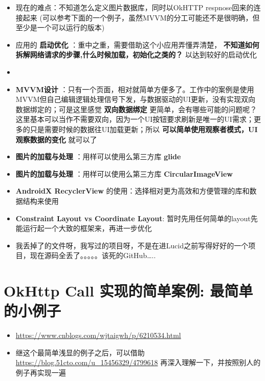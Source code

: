 \documentclass[9pt, b5paper]{article}
\begin{document}
\begin{itemize}
\item 现在的难点：不知道怎么定义图片数据库，同时以OkHTTP respnose回来的连接起来 (可以参考下面的一个例子，虽然MVVM的分工可能还不是很明确，但至少是一个可以运行的版本)
\item 应用的 \textbf{启动优化} ：重中之重，需要借助这个小应用弄懂弄清楚， \textbf{不知道如何拆解网络请求的步骤,什么时候加载，初始化之类的？} 以达到较好的启动优化
\item 
\item \textbf{MVVM设计} ：只有一个页面，相对就简单方便多了。工作中的案例是使用MVVM但自己编辑逻辑处理信号下发，与数据驱动的UI更新，没有实现双向数据绑定的；可是这里感觉 \textbf{双向数据绑定} 更简单，会有哪些可能的问题呢？这里基本可以当作不需要双向，因为一个UI按钮要求刷新是唯一的UI需求；更多的只是需要时候的数据往UI加载更新；所以 \textbf{可以简单使用观察者模式，UI观察数据的变化} 就可以了
\item \textbf{图片的加载与处理} ：用样可以使用么第三方库 \textbf{glide}
\item \textbf{图片的加载与处理} ：用样可以使用么第三方库 \textbf{CircularImageView}
\item \textbf{AndroidX RecyclerView} 的使用：选择相对更为高效和方便管理的库和数据结构来使用
\item \textbf{Constraint Layout vs Coordinate Layout}: 暂时先用任何简单的layout先能运行起一个大致的框架来，再进一步优化
\item 我丢掉了的文件呀，我写过的项目呀，不是在进Lucid之前写得好好的一个项目，现在源码全丢了。。。。。该死的GitHub\ldots{}..
\end{itemize}

\section{OkHttp Call 实现的简单案例: 最简单的小例子}
\label{sec-3}
\begin{itemize}
\item \url{https://www.cnblogs.com/wjtaigwh/p/6210534.html}
\item 继这个最简单浅显的例子之后，可以借助\url{https://blog.51cto.com/u_15456329/4799618} 再深入理解一下，并按照别人的例子再实现一遍
\end{itemize}
\end{document}
